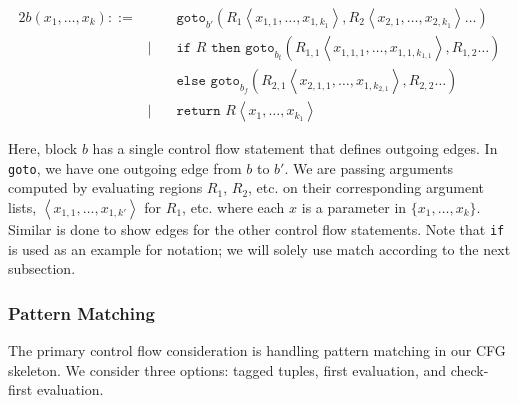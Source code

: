 \documentclass{article}
\begin{document}
\begin{alignat*}{2}
b(x_1, \dots, x_k) ::=&\, &&\texttt{goto}_{b'} \left( R_1 \left\langle x_{1,1}, \dots, x_{1,k_1} \right\rangle , R_2 \left\langle x_{2,1}, \dots, x_{2,k_1} \right\rangle \dots\right) \\
    &|\, &&\texttt{if } R \texttt{ then } \texttt{goto}_{b_t} \left( R_{1,1} \left\langle x_{1,1,1}, \dots, x_{1,1,k_{1,1}} \right\rangle , R_{1,2}\dots\right)\\
    & &&\texttt{else } \texttt{goto}_{b_f} \left( R_{2,1} \left\langle x_{2,1,1}, \dots, x_{1,k_{2,1}} \right\rangle, R_{2,2} \dots\right) \\
    &| &&\texttt{return } R \left\langle x_{1}, \dots, x_{k_1} \right\rangle
\end{alignat*}

Here, block $b$ has a single control flow statement that defines outgoing edges. In \texttt{goto}, we have one outgoing edge from $b$ to $b'$. We are passing arguments computed by evaluating regions $R_1$, $R_2$, etc. on their corresponding argument lists, $ \left\langle x_{1,1}, \dots, x_{1,k'} \right\rangle$ for $R_1$, etc. where each $x$ is a parameter in $\{x_1, \dots, x_k\}$. Similar is done to show edges for the other control flow statements. Note that \texttt{if} is used as an example for notation; we will solely use match according to the next subsection.


\subsubsection{Pattern Matching}

The primary control flow consideration is handling pattern matching in our CFG skeleton. We consider three options: tagged tuples, first evaluation, and check-first evaluation.
\end{document}
